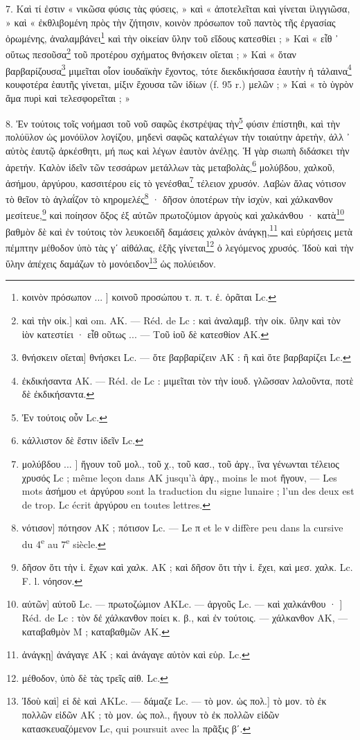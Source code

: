 \documentclass[a4paper, 11pt, oneside, polutonikogreek, french]{article}
\begin{document}
7. Καὶ τί ἐστιν « νικῶσα φύσις τὰς φύσεις, » καὶ « ἀποτελεῖται καὶ γίνεται ἰλιγγιῶσα, » καὶ « ἐκθλιβομένη πρὸς τὴν ζήτησιν, κοινὸν πρόσωπον τοῦ παντὸς τῆς ἐργασίας ὁρωμένης, ἀναλαμβάνει\footnote{κοινὸν πρόσωπον ... ] κοινοῦ προσώπου τ. π. τ. ἐ. ὁρᾶται Lc.} καὶ τὴν οἰκείαν ὕλην τοῦ εἴδους κατεσθίει ; » Καὶ « εἶθ ᾽ οὕτως πεσοῦσα\footnote{καὶ τὴν οἰκ.] καὶ om. AK. --- Réd. de Lc : καὶ ἀναλαμβ. τὴν οἰκ. ὕλην καὶ τὸν ἰὸν κατεστίει · εἶθ οῦτως ... --- Τοῦ ἰοῦ δὲ κατεσθίον AK.} τοῦ προτέρου σχήματος θνήσκειν οἴεται ; » Καὶ « ὅταν βαρβαρίζουσα\footnote{θνήσκειν οἴεται] θνήσκει Lc. --- ὅτε βαρβαρίζειν AK : ἣ καὶ ὅτε βαρβαρίζει Lc.} μιμεῖται οἷον ἰουδαϊκὴν ἔχοντος, τότε διεκδικήσασα ἑαυτὴν ἡ τάλαινα\footnote{ἐκδικήσαντα AK. --- Réd. de Lc : μιμεῖται τὸν τὴν ἰουδ. γλῶσσαν λαλοῦντα, ποτὲ δὲ ἐκδικήσαντα.} κουφοτέρα ἑαυτῆς γίνεται, μίξιν ἔχουσα τῶν ἰδίων (f. 95 r.) μελῶν ; » Καὶ « τὸ ὑγρὸν ἅμα πυρὶ καὶ τελεσφορεῖται ; »

8. Ἐν τούτοις τοῖς νοήμασι τοῦ νοῦ σαφῶς ἐκστρέψας τὴν\footnote{Ἐν τούτοις οὗν Lc.} φύσιν ἐπίστηθι, καὶ τὴν πολύϋλον ὡς μονόϋλον λογίζου, μηδενὶ σαφῶς καταλέγων τὴν τοιαύτην ἀρετὴν, ἀλλ ᾽ αὐτὸς ἑαυτῷ ἀρκέσθητι, μή πως καὶ λέγων ἑαυτὸν ἀνέλῃς. Ἡ γὰρ σιωπὴ διδάσκει τὴν ἀρετήν. Καλὸν ἰδεῖν τῶν τεσσάρων μετάλλων τὰς μεταβολὰς,\footnote{κάλλιστον δὲ ἔστιν ἰδεῖν Lc.} μολύβδου, χαλκοῦ, ἀσήμου, ἀργύρου, κασσιτέρου εἰς τὸ γενέσθαι\footnote{μολύβδου ... ] ἤγουν τοῦ μολ., τοῦ χ., τοῦ κασ., τοῦ ἀργ., ἵνα γένωνται τέλειος χρυσός Lc ; même leçon dans AK jusqu'à ἀργ., moins le mot ἤγουν, --- Les mots ἀσήμου et ἀργύρου sont la traduction du signe lunaire ; l'un des deux est de trop. Lc écrit ἀργύρου en toutes lettres.} τέλειον χρυσόν. Λαβὼν ἅλας νότισον τὸ θεῖον τὸ ἀγλαΐζον τὸ κηρομελές\footnote{νότισον] πότησον AK ; πότισον Lc. --- Le π et le ν diffère peu dans la cursive du 4\textsuperscript{e} au 7\textsuperscript{e} siècle.} · δῆσον ὁποτέρων τὴν ἰσχὺν, καὶ χάλκανθον μεσίτευε,\footnote{δῆσον ὅτι τὴν ἰ. ἔχων καὶ χαλκ. AK ; καὶ δῆσον ὅτι τὴν ἰ. ἔχει, καὶ μεσ. χαλκ. Lc. F. l. νόησον.} καὶ ποίησον ὄξος ἐξ αὐτῶν πρωτοζύμιον ἀργοὺς καὶ χαλκάνθου · κατὰ\footnote{αὐτῶν] αὐτοῦ Lc. --- πρωτοζώμιον AKLc. --- ἀργοῦς Lc. --- καὶ χαλκάνθου · ] Réd. de Lc : τὸν δἐ χάλκανθον ποίει κ. β., καὶ ἐν τούτοις. --- χάλκανθον AK, --- καταβαθμὸν M ; καταβαθμῶν AK.} βαθμὸν δὲ καὶ ἐν τούτοις τὸν λευκοειδῆ δαμάσεις χαλκὸν ἀνάγκῃ,\footnote{ἀνάγκῃ] ἀνάγαγε AK ; καὶ ἀνάγαγε αὐτὸν καὶ εὑρ. Lc.} καὶ εὑρήσεις μετὰ πέμπτην μέθοδον ὑπὸ τὰς γʹ αἰθάλας, ἑξῆς γίνεται\footnote{μέθοδον, ὑπὸ δὲ τὰς τρεῖς αἰθ. Lc.} ὁ λεγόμενος χρυσός. Ἰδοὺ καὶ τὴν ὕλην ἀπέχεις δαμάζων τὸ μονόειδον\footnote{Ἰδοὺ καὶ] εἰ δὲ καὶ AKLc. --- δάμαζε Lc. --- τὸ μον. ὡς πολ.] τὸ μον. τὸ ἐκ πολλῶν εἰδῶν AK ; τὸ μον. ὡς πολ., ἤγουν τὸ ἐκ πολλῶν εἰδῶν κατασκευαζόμενον Lc, qui poursuit avec la πρᾶξις βʹ.} ὡς πολύειδον.
\end{document}
